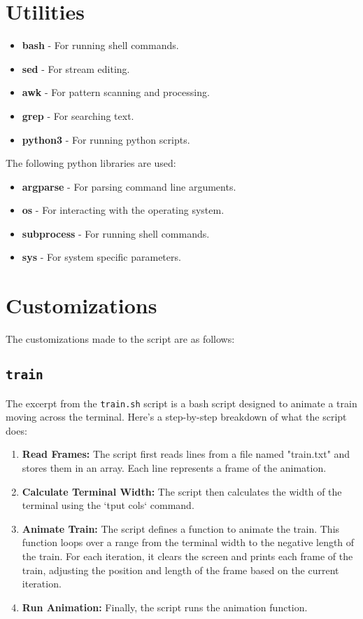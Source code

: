 \documentclass{article}
\begin{document}
\section{Utilities}
\begin{itemize}
    \item \textbf{bash} - For running shell commands.
    \item \textbf{sed} - For stream editing.
    \item \textbf{awk} - For pattern scanning and processing.
    \item \textbf{grep} - For searching text.
    \item \textbf{python3} - For running python scripts.
\end{itemize}
The following python libraries are used:
\begin{itemize}
    \item \textbf{argparse} - For parsing command line arguments.
    \item \textbf{os} - For interacting with the operating system.
    \item \textbf{subprocess} - For running shell commands.
    \item \textbf{sys} - For system specific parameters.
\end{itemize}
\section{Customizations}
The customizations made to the script are as follows:
\subsection{\texttt{train}}
The excerpt from the \texttt{train.sh} script is a bash script designed to animate a train moving across the terminal. Here's a step-by-step breakdown of what the script does:

\begin{enumerate}
    \item \textbf{Read Frames:} The script first reads lines from a file named "train.txt" and stores them in an array. Each line represents a frame of the animation.

    \item \textbf{Calculate Terminal Width:} The script then calculates the width of the terminal using the `tput cols` command.

    \item \textbf{Animate Train:} The script defines a function to animate the train. This function loops over a range from the terminal width to the negative length of the train. For each iteration, it clears the screen and prints each frame of the train, adjusting the position and length of the frame based on the current iteration.

    \item \textbf{Run Animation:} Finally, the script runs the animation function.
\end{enumerate}
\end{document}
